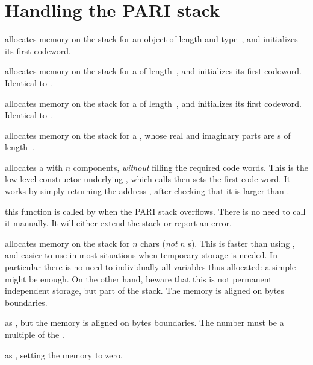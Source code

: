\section{Handling the PARI stack}


 allocates memory on the stack for
an object of length  and type~, and initializes its first
codeword.

 allocates memory on the stack for a 
of length~, and initializes its first codeword. Identical to
.

 allocates memory on the stack for a 
of length~, and initializes its first codeword. Identical to
.

 allocates memory on the stack for a
, whose real and imaginary parts are s
of length~.

 allocates a  with $n$ components,
\emph{without} filling the required code words. This is the low-level
constructor underlying , which calls  then sets
the first code word. It works by simply returning the address
, after checking that it is larger than .

 this function is called by
 when the PARI stack overflows. There is no need to call it
manually. It will either extend the stack or report an  error.

 allocates memory on the stack for $n$
chars (\emph{not} $n$ s). This is faster than using ,
and easier to use in most situations when temporary storage is needed. In
particular there is no need to  individually all variables thus
allocated: a simple  might be enough. On the other hand,
beware that this is not permanent independent storage, but part of the stack.
The memory is aligned on  bytes boundaries.

 as ,
but the memory is aligned on  bytes boundaries. The number must
be a multiple of the .

 as , setting the memory
to zero.

